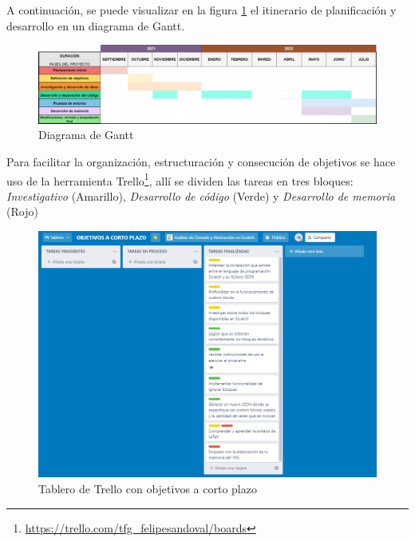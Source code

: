 \documentclass[a4paper, 12pt]{book}
\begin{document}
A continuación, se puede visualizar en la figura \ref{fig:diagrama_gantt} el itinerario de planificación y desarrollo en un diagrama de Gantt.

\begin{figure}[h]
	\centering
    \includegraphics[width=16cm, keepaspectratio]{img/gantt.jpg}
    \caption{Diagrama de Gantt}
    \label{fig:diagrama_gantt}
\end{figure}

\pagebreak 
Para facilitar la organización, estructuración y consecución de objetivos se hace uso de la herramienta Trello\footnote{\url{https://trello.com/tfg_felipesandoval/boards}}, allí se dividen las tareas en tres bloques: \textit{Investigativo} (Amarillo), \textit{Desarrollo de código} (Verde) y \textit{Desarrollo de memoria} (Rojo) 

 \begin{figure}[h]
 	 \centering
    \includegraphics[width=15cm, keepaspectratio]{img/obj_cortoplazo.png}
    \caption{Tablero de Trello con objetivos a corto plazo}
    \label{fig:tableros_trello}
 \end{figure}
\end{document}
